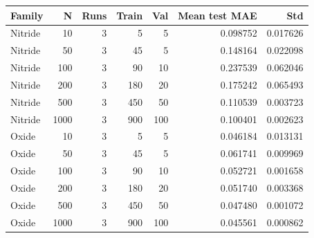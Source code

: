 \begin{tabular}{lrrrrrr}
\toprule
Family & N & Runs & Train & Val & Mean test MAE & Std \\
\midrule
Nitride & 10 & 3 & 5 & 5 & 0.098752 & 0.017626 \\
Nitride & 50 & 3 & 45 & 5 & 0.148164 & 0.022098 \\
Nitride & 100 & 3 & 90 & 10 & 0.237539 & 0.062046 \\
Nitride & 200 & 3 & 180 & 20 & 0.175242 & 0.065493 \\
Nitride & 500 & 3 & 450 & 50 & 0.110539 & 0.003723 \\
Nitride & 1000 & 3 & 900 & 100 & 0.100401 & 0.002623 \\
Oxide & 10 & 3 & 5 & 5 & 0.046184 & 0.013131 \\
Oxide & 50 & 3 & 45 & 5 & 0.061741 & 0.009969 \\
Oxide & 100 & 3 & 90 & 10 & 0.052721 & 0.001658 \\
Oxide & 200 & 3 & 180 & 20 & 0.051740 & 0.003368 \\
Oxide & 500 & 3 & 450 & 50 & 0.047480 & 0.001072 \\
Oxide & 1000 & 3 & 900 & 100 & 0.045561 & 0.000862 \\
\bottomrule
\end{tabular}
